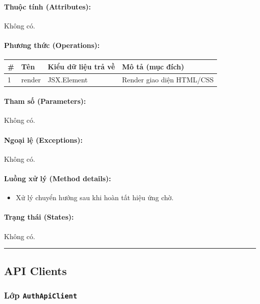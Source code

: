 \documentclass[12pt,a4paper]{article}
\begin{document}
\paragraph{Thuộc tính (Attributes):}
Không có.

\paragraph{Phương thức (Operations):}
\begin{longtable}{|p{0.6cm}|p{5.0cm}|p{2.8cm}|p{5.4cm}|}
\hline
\textbf{\#} & \textbf{Tên} & \textbf{Kiểu dữ liệu trả về} & \textbf{Mô tả (mục đích)} \\ \hline
\endhead
1 & render & JSX.Element & Render giao diện HTML/CSS \\ \hline
\end{longtable}

\paragraph{Tham số (Parameters):}
Không có.

\paragraph{Ngoại lệ (Exceptions):}
Không có.

\paragraph{Luồng xử lý (Method details):}
\begin{itemize}[leftmargin=*]
    \item Xử lý chuyển hướng sau khi hoàn tất hiệu ứng chờ.
\end{itemize}


\paragraph{Trạng thái (States):}
Không có.

\vskip 0.5cm
\noindent\rule{\textwidth}{0.5pt}
\vskip 0.5cm

\subsection{API Clients}


\subsubsection{Lớp \texttt{AuthApiClient}}
\end{document}
